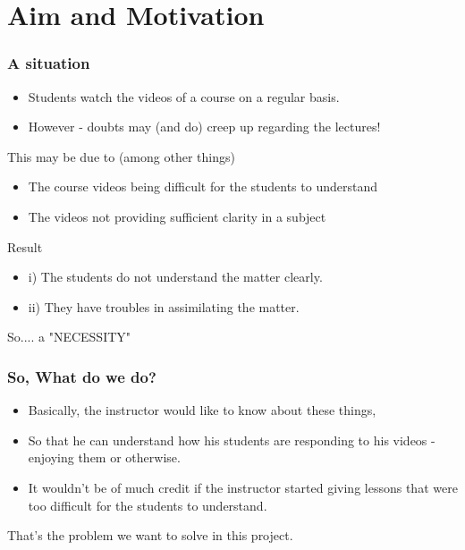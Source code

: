 \documentclass[12pt,xcolor=dvipsnames]{beamer}
\begin{document}
\section{Aim and Motivation}
\begin{frame}[t]
\frametitle{A situation}

\begin{itemize}
\item Students watch the videos of a course on a regular basis.
\item However 	- doubts may (and do) creep up regarding the lectures!
\end{itemize}
This may be due to (among other things)
\begin{itemize}
\item The course videos being difficult for the students to understand
\item The videos not providing sufficient clarity in a subject
\end{itemize}
Result 	
\begin{itemize}
\item i) 	The students do not understand the matter clearly.
\item ii)	They have troubles in assimilating the matter.
\end{itemize}



\begin{center}

\begin{LARGE}
So.... a "NECESSITY"
\end{LARGE}

\end{center}

\end{frame}



\begin{frame}[t]
\frametitle{So, What do we do?}

\begin{itemize}
\item Basically, the instructor would like to know about these things,
\item So that he can understand how his students are responding to his videos - enjoying them or otherwise.
\item It wouldn't be of much credit if the instructor started giving lessons that were too difficult for the students to understand.
\end{itemize}

\vspace{40pt}
\begin{large}
That's the problem we want to solve in this project.
\end{large}

\end{frame}
\end{document}

